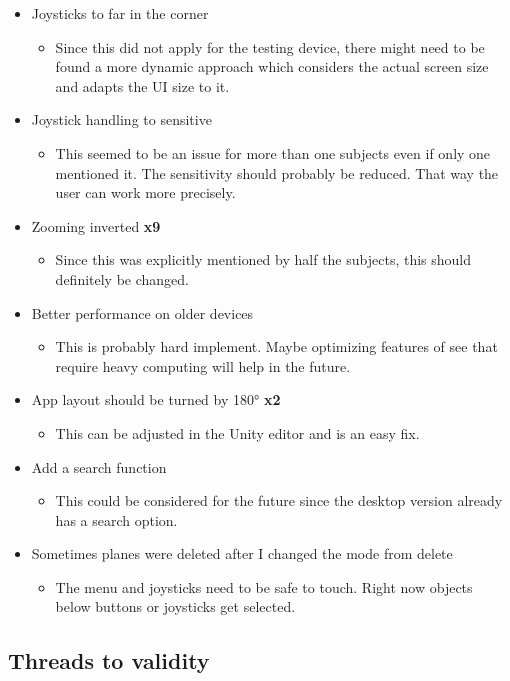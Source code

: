 \begin{itemize}
\begin{itemize}
  \end{itemize}
  \item Joysticks to far in the corner
  \begin{itemize}
    \item Since this did not apply for the testing device, there might need to be found a more dynamic approach which considers the actual screen size and adapts the UI size to it. 
  \end{itemize}
  \item Joystick handling to sensitive 
  \begin{itemize}
    \item This seemed to be an issue for more than one subjects even if only one mentioned it. The sensitivity should probably be reduced. That way the user can work more precisely.
  \end{itemize}
  \item Zooming inverted \textbf{x9}
  \begin{itemize}
    \item Since this was explicitly mentioned by half the subjects, this should definitely be changed. 
  \end{itemize}
  \item Better performance on older devices
  \begin{itemize}
    \item This is probably hard implement. Maybe optimizing features of \gls{see} that require heavy computing will help in the future.
  \end{itemize}
  \item App layout should be turned by 180° \textbf{x2}
  \begin{itemize}
    \item This can be adjusted in the Unity editor and is an easy fix. 
  \end{itemize}
  \item Add a search function
  \begin{itemize}
    \item This could be considered for the future since the desktop version already has a search option.
  \end{itemize}
  \item Sometimes planes were deleted after I changed the mode from delete
  \begin{itemize}
    \item The menu and joysticks need to be safe to touch. Right now objects below buttons or joysticks get selected.
  \end{itemize}
\end{itemize} 

\subsection{Threads to validity}
\label{sec:validity}